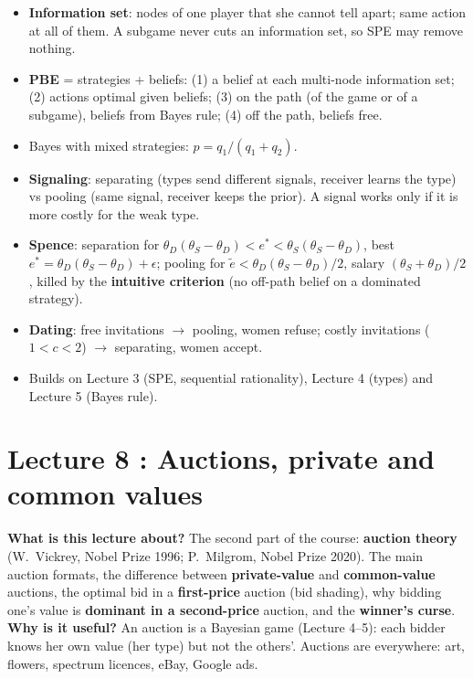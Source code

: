 \documentclass[11pt,a4paper,openany]{book}
\begin{document}
\begin{keybox}[title=Exam recap]
\begin{itemize}
  \item \textbf{Information set}: nodes of one player that she cannot tell apart; same action
        at all of them. A subgame never cuts an information set, so SPE may remove nothing.
  \item \textbf{PBE} = strategies + beliefs: (1) a belief at each multi-node information
        set; (2) actions optimal given beliefs; (3) on the path (of the game or of a
        subgame), beliefs from Bayes rule; (4) off the path, beliefs free.
  \item Bayes with mixed strategies: $p = q_1/(q_1 + q_2)$.
  \item \textbf{Signaling}: separating (types send different signals, receiver learns the
        type) vs pooling (same signal, receiver keeps the prior). A signal works only if it
        is more costly for the weak type.
  \item \textbf{Spence}: separation for
        $\theta_D(\theta_S - \theta_D) < e^* < \theta_S(\theta_S - \theta_D)$, best
        $e^* = \theta_D(\theta_S - \theta_D) + \epsilon$; pooling for
        $\tilde{e} < \theta_D(\theta_S - \theta_D)/2$, salary $(\theta_S + \theta_D)/2$,
        killed by the \textbf{intuitive criterion} (no off-path belief on a dominated
        strategy).
  \item \textbf{Dating}: free invitations $\to$ pooling, women refuse; costly invitations
        ($1 < c < 2$) $\to$ separating, women accept.
  \item Builds on Lecture 3 (SPE, sequential rationality), Lecture 4 (types) and Lecture 5
        (Bayes rule).
\end{itemize}
\end{keybox}


\chapter{Lecture 8 : Auctions, private and common values}

\begin{rembox}[title=In a nutshell]
\textbf{What is this lecture about?} The second part of the course: \textbf{auction theory}
(W.\ Vickrey, Nobel Prize 1996; P.\ Milgrom, Nobel Prize 2020). The main auction formats, the
difference between \textbf{private-value} and \textbf{common-value} auctions, the optimal bid
in a \textbf{first-price} auction (bid shading), why bidding one's value is
\textbf{dominant in a second-price} auction, and the \textbf{winner's curse}. \\
\textbf{Why is it useful?} An auction is a Bayesian game (Lecture 4--5): each bidder knows her
own value (her type) but not the others'. Auctions are everywhere: art, flowers, spectrum
licences, eBay, Google ads.
\end{rembox}
\end{document}

